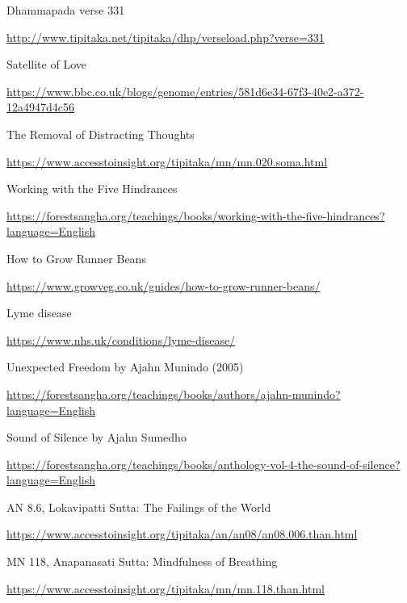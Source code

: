 \begin{thebibliography}{9}
 Dhammapada verse 331

  {\urlsize \url{http://www.tipitaka.net/tipitaka/dhp/verseload.php?verse=331}}

 Satellite of Love

  {\urlsize \url{https://www.bbc.co.uk/blogs/genome/entries/581d6e34-67f3-40e2-a372-12a4947d4c56}}

 The Removal of Distracting Thoughts

  {\urlsize \url{https://www.accesstoinsight.org/tipitaka/mn/mn.020.soma.html}}

 Working with the Five Hindrances

  {\urlsize \url{https://forestsangha.org/teachings/books/working-with-the-five-hindrances?language=English}}

 How to Grow Runner Beans

  {\urlsize \url{https://www.growveg.co.uk/guides/how-to-grow-runner-beans/}}

 Lyme disease

  {\urlsize \url{https://www.nhs.uk/conditions/lyme-disease/}}

 Unexpected Freedom by Ajahn Munindo (2005)

  {\urlsize \url{https://forestsangha.org/teachings/books/authors/ajahn-munindo?language=English}}

 Sound of Silence by Ajahn Sumedho

  {\urlsize \url{https://forestsangha.org/teachings/books/anthology-vol-4-the-sound-of-silence?language=English}}

 AN 8.6, Lokavipatti Sutta: The Failings of the World

  {\urlsize \url{https://www.accesstoinsight.org/tipitaka/an/an08/an08.006.than.html}}

 MN 118, Anapanasati Sutta: Mindfulness of Breathing

  {\urlsize \url{https://www.accesstoinsight.org/tipitaka/mn/mn.118.than.html}}

\end{thebibliography}
